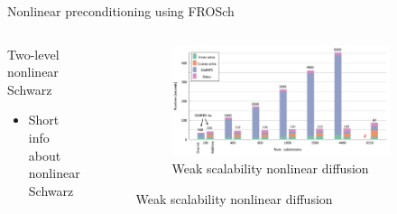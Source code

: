 \begin{frame}[noframenumbering]{Nonlinear preconditioning using FROSch}
	\begin{columns}
		\begin{column}{0.49\textwidth}
			\begin{block}{Two-level nonlinear Schwarz}
				\begin{itemize}
					\item Short info about nonlinear Schwarz
				\end{itemize}
			\end{block}
		\end{column}
		\begin{column}{0.49\textwidth}
			\begin{figure}
                \begin{subfigure}{\textwidth}
					\centering
                    \includegraphics[width=\textwidth]{images/nonlin-laplace-scalability.png}
                    \caption{Weak scalability nonlinear diffusion}
				\end{subfigure}
			\end{figure}
		\end{column}
	\end{columns}
\end{frame}
